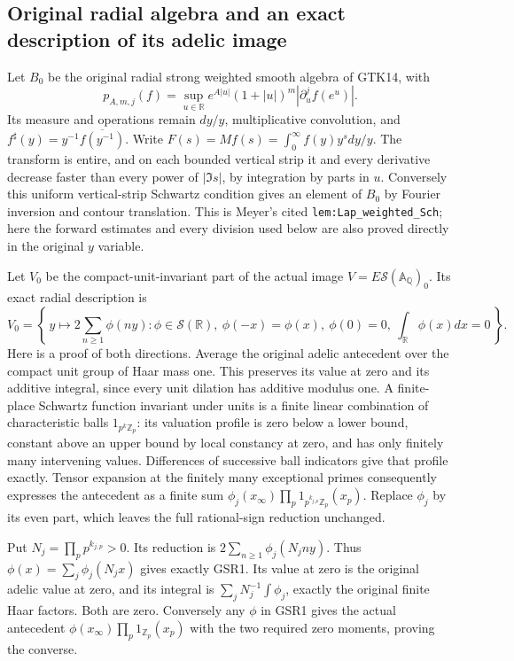 \subsection{Original radial algebra and an exact description of its adelic image}

Let $B_0$ be the original radial strong weighted smooth algebra
of GTK14, with
\[
 p_{A,m,j}(f)=\sup_{u\in\mathbb R}e^{A|u|}(1+|u|)^m
                         |\partial_u^j f(e^u)|.
\]
Its measure and operations remain
$dy/y$, multiplicative convolution, and
$f^\sharp(y)=y^{-1}\overline{f(y^{-1})}$.
Write $F(s)=Mf(s)=\int_0^\infty f(y)y^sdy/y$.
The transform is entire, and on each bounded vertical strip
it and every derivative decrease faster than every power of
$|\Im s|$, by integration by parts in $u$.
Conversely this uniform vertical-strip Schwartz condition
gives an element of $B_0$ by Fourier inversion and contour
translation. This is Meyer's cited
\texttt{lem:Lap\_weighted\_Sch}; here the forward estimates
and every division used below are also proved directly in
the original $y$ variable.

Let $V_0$ be the compact-unit-invariant part of the actual
image $V=E\mathcal S(\mathbb A_{\mathbb Q})_0$.
Its exact radial description is
\begin{equation}\tag{GSR1}
 V_0=\left\{\,y\longmapsto2\sum_{n\ge1}\phi(ny):
       \phi\in\mathcal S(\mathbb R),\ \phi(-x)=\phi(x),\
       \phi(0)=0,\ \int_{\mathbb R}\phi(x)dx=0\,\right\}.
\end{equation}
Here is a proof of both directions. Average the original
adelic antecedent over the compact unit group of Haar mass
one. This preserves its value at zero and its additive
integral, since every unit dilation has additive modulus one.
A finite-place Schwartz function invariant under units is a
finite linear combination of characteristic balls
$1_{p^k\mathbb Z_p}$: its valuation profile is zero below
a lower bound, constant above an upper bound by local
constancy at zero, and has only finitely many intervening
values. Differences of successive ball indicators give
that profile exactly. Tensor expansion at the finitely
many exceptional primes consequently expresses the
antecedent as a finite sum
$\phi_j(x_\infty)\prod_p1_{p^{k_{j,p}}\mathbb Z_p}(x_p)$.
Replace $\phi_j$ by its even part, which leaves the
full rational-sign reduction unchanged.

Put $N_j=\prod_pp^{k_{j,p}}>0$. Its reduction is
$2\sum_{n\ge1}\phi_j(N_jny)$. Thus
$\phi(x)=\sum_j\phi_j(N_jx)$ gives exactly GSR1.
Its value at zero is the original adelic value at zero,
and its integral is
$\sum_jN_j^{-1}\int\phi_j$, exactly the original finite
Haar factors. Both are zero. Conversely any $\phi$
in GSR1 gives the actual antecedent
$\phi(x_\infty)\prod_p1_{\mathbb Z_p}(x_p)$ with the
two required zero moments, proving the converse.

